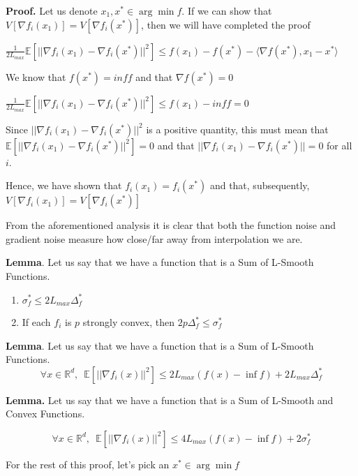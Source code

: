 \noindent \textbf{Proof.} Let us denote $x_1, x^* \in \arg \min f$. If we can show that $V[\nabla f_i(x_1)] = V[\nabla f_i(x^*)]$, then we will have completed the proof 

$\frac{1}{2L_{max}} \mathbb{E}[||\nabla f_i(x_1) - \nabla f_i(x^*)||^2] \leq f(x_1) - f(x^*) - \langle \nabla f(x^*), x_1 - x^* \rangle$

We know that $f(x^*) = inf f$ and that $\nabla f(x^*) = 0$ \newline 

$\frac{1}{2L_{max}} \mathbb{E}[||\nabla f_i(x_1) - \nabla f_i(x^*)||^2] \leq f(x_1) - inf f = 0$

Since $||\nabla f_i(x_1) - \nabla f_i(x^*)||^2$ is a positive quantity, this must mean that $\mathbb{E}[||\nabla f_i(x_1) - \nabla f_i(x^*)||^2] = 0$ and that $||\nabla f_i(x_1) - \nabla f_i(x^*)|| = 0$ for all $i$. 

Hence, we have shown that $f_i(x_1) = f_i(x^*)$ and that, subsequently, $V[\nabla f_i(x_1)] = V[\nabla f_i(x^*)]$

\noindent From the aforementioned analysis it is clear that both the function noise and gradient noise measure how close/far away from interpolation we are. 

\noindent \textbf{Lemma}. Let us say that we have a function that is a Sum of L-Smooth Functions. 

\begin{enumerate}
    \item $\sigma_f^* \leq 2L_{max} \Delta^*_f$
    \item If each $f_i$ is $p$ strongly convex, then $2p\Delta^*_f \leq \sigma_f^*$
\end{enumerate}

\noindent \textbf{Lemma}.  Let us say that we have a function that is a Sum of L-Smooth Functions. 
\begin{equation}
    \forall x \in \mathbb{R}^d, \enspace \mathbb{E}[||\nabla f_i(x)||^2] \leq 2L_{max} (f(x) - \inf f) + 2L_{max} \Delta^*_f
\end{equation}

\noindent \textbf{Lemma. } Let us say that we have a function that is a Sum of L-Smooth and Convex Functions. 

\begin{equation}
\forall x \in \mathbb{R}^d, \enspace \mathbb{E}[||\nabla f_i(x)||^2] \leq 4L_{max} (f(x) - \inf f) + 2\sigma^*_f
\end{equation}

For the rest of this proof, let's pick an $x^* \in \arg \min f$

